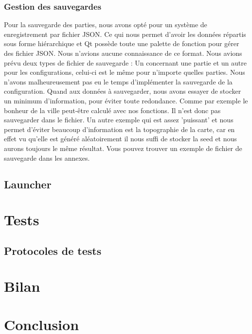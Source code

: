 \documentclass[a4paper,10pt,openany,oneside]{book}
\begin{document}
\subsection{Gestion des sauvegardes}
Pour la sauvegarde des parties, nous avons opté pour un système de enregistrement par fichier JSON. Ce qui nous permet d'avoir les données répartis sous forme hiérarchique et Qt possède toute une palette de fonction pour gérer des fichier JSON. Nous n'avions aucune connaissance de ce format.
\newline
Nous avions prévu deux types de fichier de sauvegarde : Un concernant une partie et un autre pour les configurations, celui-ci est le même pour n'importe quelles parties. Nous n'avons malheureusement pas eu le temps d'implémenter la sauvegarde de la configuration.
\newline
Quand aux données à sauvegarder, nous avons essayer de stocker un minimum d'information, pour éviter toute redondance. Comme par exemple le bonheur de la ville peut-être calculé avec nos fonctions. Il n'est donc pas sauvegarder dans le fichier. Un autre exemple qui est assez 'puissant' et nous permet d'éviter beaucoup d'information est la topographie de la carte, car en effet vu qu'elle est généré aléatoirement il nous suffi de stocker la seed et nous aurons toujours le même résultat.
\newline
Vous pouvez trouver un exemple de fichier de sauvegarde dans les annexes.

\section{Launcher}

\chapter{Tests}
\thispagestyle{headings}
\section{Protocoles de tests}


\chapter{Bilan}
\thispagestyle{headings}


\chapter{Conclusion}
\thispagestyle{headings}
\end{document}
